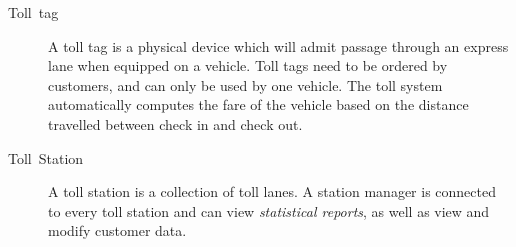\begin{description}
\item [{Toll~tag}] A toll tag is a physical device which will admit passage
through an express lane when equipped on a vehicle. Toll tags need
to be ordered by customers, and can only be used by one vehicle. The
toll system automatically computes the fare of the vehicle based on
the distance travelled between check in and check out.

\item [{Toll~Station}] A toll station is a collection of toll lanes. A
station manager is connected to every toll station and can view \emph{statistical
reports}, as well as view and modify customer data.







\end{description}
